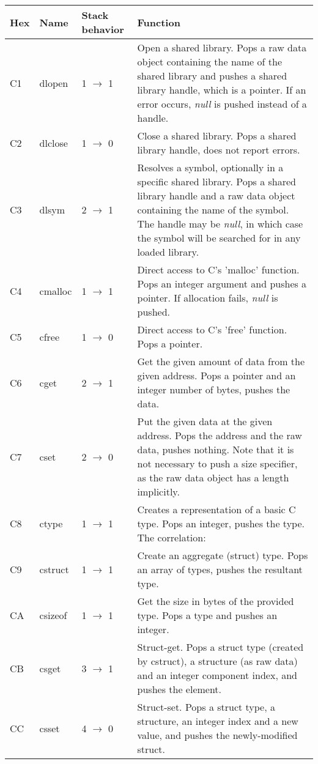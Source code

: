 \begin{longtable}{ | l | l | l | X | }
\hline
\textbf{Hex} & \textbf{Name} & \textbf{Stack behavior} & \textbf{Function} \\
\hline\hline
C1 & dlopen & 1 $\rightarrow$ 1 & Open a shared library. Pops a raw data object containing the name of the shared library and pushes a shared library handle, which is a pointer. If an error occurs, \textit{null} is pushed instead of a handle. \\
\hline
C2 & dlclose & 1 $\rightarrow$ 0 & Close a shared library. Pops a shared library handle, does not report errors. \\
\hline
C3 & dlsym & 2 $\rightarrow$ 1 & Resolves a symbol, optionally in a specific shared library. Pops a shared library handle and a raw data object containing the name of the symbol. The handle may be \textit{null}, in which case the symbol will be searched for in any loaded library. \\
\hline
C4 & cmalloc & 1 $\rightarrow$ 1 & Direct access to C's 'malloc' function. Pops an integer argument and pushes a pointer. If allocation fails, \textit{null} is pushed. \\
\hline
C5 & cfree & 1 $\rightarrow$ 0 & Direct access to C's 'free' function. Pops a pointer. \\
\hline
C6 & cget & 2 $\rightarrow$ 1 & Get the given amount of data from the given address. Pops a pointer and an integer number of bytes, pushes the data. \\
\hline
C7 & cset & 2 $\rightarrow$ 0 & Put the given data at the given address. Pops the address and the raw data, pushes nothing. Note that it is not necessary to push a size specifier, as the raw data object has a length implicitly. \\
\hline
C8 & ctype & 1 $\rightarrow$ 1 &
Creates a representation of a basic C type. Pops an integer, pushes the type. The correlation: \\
\hline
C9 & cstruct & 1 $\rightarrow$ 1 & Create an aggregate (struct) type. Pops an array of types, pushes the resultant type. \\
\hline
CA & csizeof & 1 $\rightarrow$ 1 & Get the size in bytes of the provided type. Pops a type and pushes an integer. \\
\hline
CB & csget & 3 $\rightarrow$ 1 & Struct-get. Pops a struct type (created by cstruct), a structure (as raw data) and an integer component index, and pushes the element. \\
\hline
CC & csset & 4 $\rightarrow$ 0 & Struct-set. Pops a struct type, a structure, an integer index and a new value, and pushes the newly-modified struct. \\

\end{longtable}
